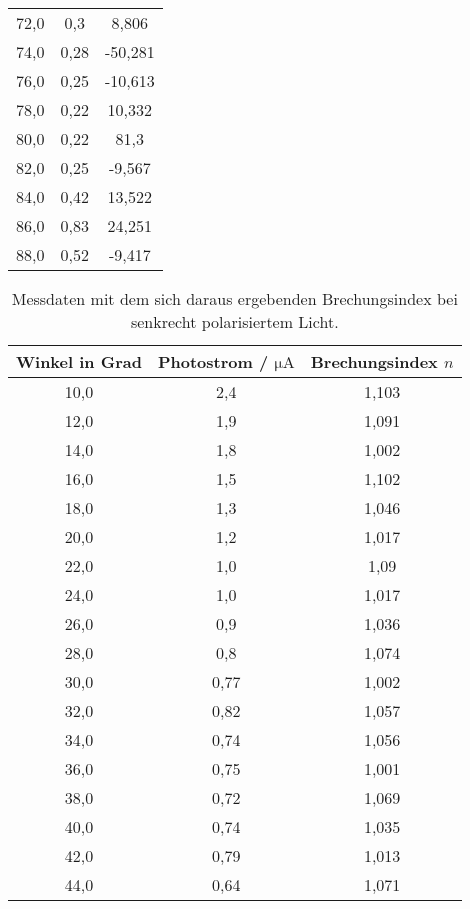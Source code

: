 \begin{table}[H]
\begin{tabular}{c c c}
        72,0  &  0,3  &  8,806  \\
        74,0  &  0,28  &  -50,281  \\
        76,0  &  0,25  &  -10,613  \\
        78,0  &  0,22  &  10,332  \\
        80,0  &  0,22  &  81,3  \\
        82,0  &  0,25  &  -9,567  \\
        84,0  &  0,42  &  13,522  \\
        86,0  &  0,83  &  24,251  \\
        88,0  &  0,52  &  -9,417  \\
        \bottomrule
    \end{tabular}
\end{table}


\begin{table}[H]
    \centering
    \caption{Messdaten mit dem sich daraus ergebenden Brechungsindex bei senkrecht polarisiertem Licht.}
    \label{tab:spolMess}
    \begin{tabular}{c c c}
        \toprule
        Winkel in Grad & Photostrom / $\si{\micro\ampere}$  & Brechungsindex $n$ \\
        \midrule
        10,0  &  2,4  &  1,103  \\
        12,0  &  1,9  &  1,091  \\
        14,0  &  1,8  &  1,002  \\
        16,0  &  1,5  &  1,102  \\
        18,0  &  1,3  &  1,046  \\
        20,0  &  1,2  &  1,017  \\
        22,0  &  1,0  &  1,09  \\
        24,0  &  1,0  &  1,017  \\
        26,0  &  0,9  &  1,036  \\
        28,0  &  0,8  &  1,074  \\
        30,0  &  0,77  &  1,002  \\
        32,0  &  0,82  &  1,057  \\
        34,0  &  0,74  &  1,056  \\
        36,0  &  0,75  &  1,001  \\
        38,0  &  0,72  &  1,069  \\
        40,0  &  0,74  &  1,035  \\
        42,0  &  0,79  &  1,013  \\
        44,0  &  0,64  &  1,071  \\

\end{tabular}
\end{table}
